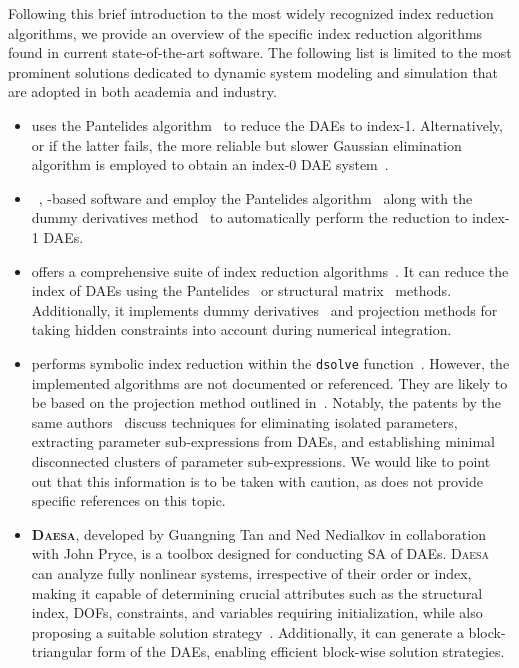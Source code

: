 Following this brief introduction to the most widely recognized index reduction algorithms, we provide an overview of the specific index reduction algorithms found in current state-of-the-art software. The following list is limited to the most prominent solutions dedicated to dynamic system modeling and simulation that are adopted in both academia and industry.
%
\begin{itemize}
  \setlength{\itemsep}{0.0em}
  \item \textbf{\Matlab{}} uses the Pantelides algorithm~\cite{pantelides1988consistent} to reduce the \acp{DAE} to index-1. Alternatively, or if the latter fails, the more reliable but slower Gaussian elimination algorithm is employed to obtain an index-0 \ac{DAE} system~\cite{matlab}.
  \item \textbf{\Modelica{}}~\cite{mattsson1997modelica, mattsson1998physical}, \Modelica{}-based software and \textbf{\ModelingToolkit{}} \cite{modelingtoolkit} employ the Pantelides algorithm~\cite{pantelides1988consistent} along with the dummy derivatives method~\cite{mattsson1993index} to automatically perform the reduction to index-1 \acp{DAE}.
  \item \textbf{\Mathematica{}} offers a comprehensive suite of index reduction algorithms~\cite{mathematica}. It can reduce the index of \acp{DAE} using the Pantelides~\cite{pantelides1988consistent} or structural matrix~\cite{unger1995structural, chowdhry2004symbolic} methods. Additionally, it implements dummy derivatives~\cite{mattsson1993index} and projection methods for taking hidden constraints into account during numerical integration.
  \item \textbf{\Maple{}} performs symbolic index reduction within the \texttt{dsolve} function~\cite{maple}. However, the implemented algorithms are not documented or referenced. They are likely to be based on the projection method outlined in~\cite{shmoylova2013simplification}. Notably, the patents by the same authors~\cite{postma2012exact, shmoylova2012method, postma2015exact} discuss techniques for eliminating isolated parameters, extracting parameter sub-expressions from \acp{DAE}, and establishing minimal disconnected clusters of parameter sub-expressions. We would like to point out that this information is to be taken with caution, as \Maple{} does not provide specific references on this topic.
  \item \textbf{\textsc{Daesa}}, developed by Guangning Tan and Ned Nedialkov in collaboration with John Pryce, is a \Matlab{} toolbox designed for conducting \ac{SA} of \acp{DAE}. \textsc{Daesa} can analyze fully nonlinear systems, irrespective of their order or index, making it capable of determining crucial attributes such as the structural index, \acp{DOF}, constraints, and variables requiring initialization, while also proposing a suitable solution strategy~\cite{nedialkov2015algorithm, tan2016symbolic}. Additionally, it can generate a block-triangular form of the \acp{DAE}, enabling efficient block-wise solution strategies.

\end{itemize}
